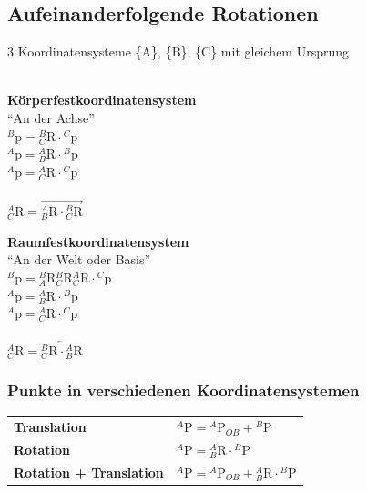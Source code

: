 \subsection{Aufeinanderfolgende Rotationen}
3 Koordinatensysteme \{A\}, \{B\}, \{C\} mit gleichem Ursprung\\ \\
\begin{minipage}{6cm}
    \textbf{Körperfestkoordinatensystem}\\
    "`An der Achse"'\\
    ${}^B\mathrm{p}={}^B_C\mathrm{R}\cdot{}^C\mathrm{p}$\\
    ${}^A\mathrm{p}={}^A_B\mathrm{R}\cdot{}^B\mathrm{p}$\\
    ${}^A\mathrm{p}={}^A_C\mathrm{R}\cdot{}^C\mathrm{p}$\\ \\
    ${}^A_C\mathrm{R}=\overrightarrow{{}^A_B\mathrm{R} \cdot {}^B_C\mathrm{R}}$\\
\end{minipage}
\begin{minipage}{6cm}
    \textbf{Raumfestkoordinatensystem}\\ 
    "`An der Welt oder Basis"'\\
    ${}^B\mathrm{p}={}^B_A\mathrm{R}{}^B_C\mathrm{R}{}^A_C\mathrm{R}\cdot{}^C\mathrm{p}$\\
    ${}^A\mathrm{p}={}^A_B\mathrm{R}\cdot{}^B\mathrm{p}$\\
    ${}^A\mathrm{p}={}^A_C\mathrm{R}\cdot{}^C\mathrm{p}$\\ \\
    ${}^A_C\mathrm{R}=\overleftarrow{{}^B_C\mathrm{R} \cdot {}^A_B\mathrm{R}}$\\
\end{minipage}   

\subsubsection{Punkte in verschiedenen Koordinatensystemen }
\begin{tabular}{ll}
    \textbf{Translation}&${}^A\mathrm{P} = {}^A\mathrm{P}_{OB}+{}^B\mathrm{P} $ \\
    \textbf{Rotation} & ${}^A\mathrm{P} = {}^A_B\mathrm{R}\cdot {}^B\mathrm{P} $\\
    \textbf{Rotation + Translation}&$ {}^A\mathrm{P} = {}^A\mathrm{P}_{OB} +{}^A_B\mathrm{R}\cdot {}^B\mathrm{P} $\\
\end{tabular}
\clearpage


